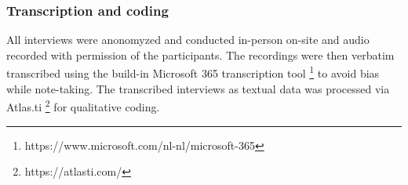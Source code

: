 \subsubsection{Transcription and coding}
All interviews were anonomyzed and conducted in-person on-site and audio recorded with permission of the participants. The recordings were then verbatim transcribed using the build-in Microsoft 365 transcription tool \footnote{https://www.microsoft.com/nl-nl/microsoft-365} to avoid bias while note-taking. The transcribed interviews as textual data was processed via Atlas.ti \footnote{https://atlasti.com/} for qualitative coding.